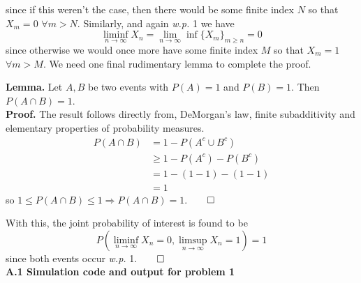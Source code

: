 \documentclass[11pt, letterpaper]{article}
\begin{document}
    since if this weren't the case, then there would be some finite index $N$ so that $X_m=0$ $\forall m>N$. Similarly, and again {\it w.p.} 1 we have
    \[\liminf_{n\rightarrow\infty}X_n=\lim_{n\rightarrow\infty}\inf\{X_m\}_{m\geq n}=0\]
    since otherwise we would once more have some finite index $M$ so that $X_m=1$ $\forall m>M$. We need one final rudimentary lemma to complete the proof.\\[3pt]
    \begin{center}
        \begin{minipage}[c]{0.85\linewidth}
            {\bf Lemma.} Let $A,B$ be two events with $P(A)=1$ and $P(B)=1$. Then $P(A\cap B)=1$.\\[10pt]
            {\bf Proof.} The result follows directly from, DeMorgan's law, finite subadditivity and elementary properties of probability measures.
            \begin{align*}
                P(A\cap B)&=1-P(A^c\cup B^c)\tag{DeMorgan's law}\\
                &\geq1-P(A^c)-P(B^c)\tag{finite subadditivity}\\
                &=1-(1-1)-(1-1)\\
                &=1
            \end{align*}
            so $1\leq P(A\cap B)\leq 1\Rightarrow P(A\cap B)=1$.\hfill{$\qed$}
        \end{minipage}\vspace{10pt}
    \end{center}
    With this, the joint probability of interest is found to be
    \[P(\liminf_{n\rightarrow\infty}X_n=0,\limsup_{n\rightarrow\infty}X_n=1)=1\]
    since both events occur {\it w.p.} 1.\hfill{$\qed$}
    \newpage
    \\[10pt]
    {\bf A.1 Simulation code and output for problem 1}
\end{document}

